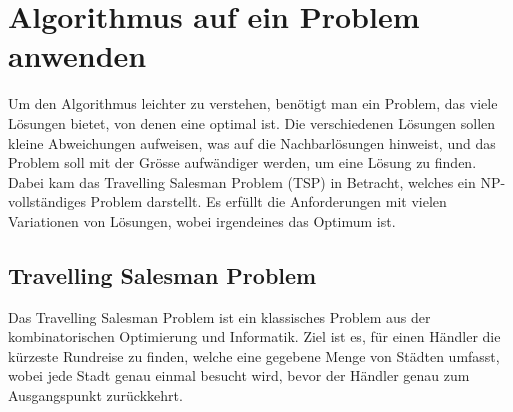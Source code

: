 %
%
%
%
\section{Algorithmus auf ein Problem anwenden
\label{buch:paper:varalg:section:find_problem}}
Um den Algorithmus leichter zu verstehen, benötigt man ein Problem, das 
viele Lösungen bietet, von denen eine optimal ist. Die verschiedenen 
Lösungen sollen kleine Abweichungen aufweisen, was auf die Nachbarlösungen hinweist, 
und das Problem soll mit der Grösse aufwändiger werden, um eine 
Lösung zu finden. Dabei kam das Travelling Salesman Problem (TSP) 
in Betracht, welches ein NP-vollständiges Problem darstellt. Es 
erfüllt die Anforderungen mit vielen Variationen von Lösungen, wobei
irgendeines das Optimum ist.

\subsection{Travelling Salesman Problem
\label{buch:paper:varalg:subsection:tsp}}
Das Travelling Salesman Problem ist ein klassisches Problem 
aus der kombinatorischen Optimierung und Informatik. Ziel ist es, 
für einen Händler die kürzeste Rundreise zu finden, welche eine 
gegebene Menge von Städten umfasst, wobei jede Stadt 
genau einmal besucht wird, bevor der Händler genau zum Ausgangspunkt 
zurückkehrt. 

